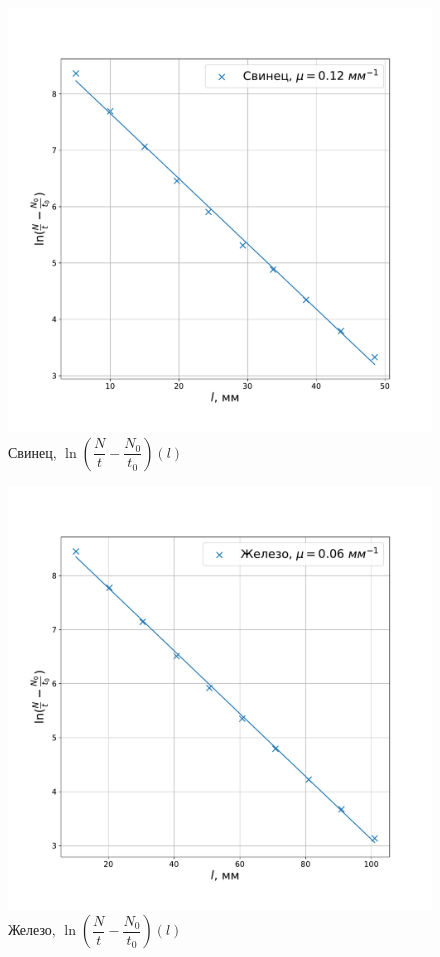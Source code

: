 \documentclass[a4paper, 12pt]{article}
\begin{document}
\begin{figure}[!h]
    \includegraphics[scale = 0.35]{graph1}
    \centering
    \caption{Свинец, $\ln (\dfrac{N}{t} - \dfrac{N_0}{t_0}) (l)$}
\end{figure}

\begin{figure}[!h]
    \includegraphics[scale = 0.35]{graph2}
    \centering
    \caption{Железо, $\ln (\dfrac{N}{t} - \dfrac{N_0}{t_0}) (l)$}
\end{figure}
\end{document}
